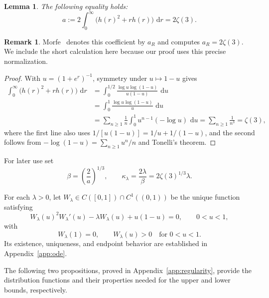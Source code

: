\documentclass[12pt,preprint]{amsart}
\numberwithin{equation}{section}
\theoremstyle{plain}
\newtheorem{lemma}[theorem]{Lemma}
\theoremstyle{definition}
\newtheorem{remark}[theorem]{Remark}
\newcommand{\dd}{\,\mathrm d}
\begin{document}
\begin{lemma}
\label{lem:diffusion-coefficient}
The following equality holds:
\begin{equation*}
a:=2\int_0^\infty\bigl(h(r)^2+rh(r)\bigr)\,\dd r=2\zeta(3).
\end{equation*}

\end{lemma}
\begin{remark}
   Morfe~\cite[Appendix~C]{Morfe2026} denotes this coefficient by \(a_R\)
and computes \(a_R=2\zeta(3)\). We include the short calculation here
because our proof uses this precise normalization.
\end{remark}
\begin{proof}

With $u=(1+e^r)^{-1}$, symmetry under $u\mapsto1-u$ gives
\[
\begin{aligned}
\int_0^\infty\bigl(h(r)^2+rh(r)\bigr)\,\dd r
 &=\int_0^{1/2}
   \frac{\log u\log(1-u)}{u(1-u)}\,\dd u
 \\&=\int_0^1\frac{\log u\log(1-u)}u\,\dd u\\
 &=\sum_{n\ge1}\frac1n
   \int_0^1u^{n-1}(-\log u)\,\dd u
 =\sum_{n\ge1}\frac1{n^3}
 =\zeta(3),
\end{aligned}
\]
where the first line also uses
$1/[u(1-u)]=1/u+1/(1-u)$, and the second follows from
$-\log(1-u)=\sum_{n\ge1}u^n/n$ and Tonelli's theorem.
\end{proof}

For later use set
\begin{equation}
 \beta=\left(\frac2a\right)^{1/3},
 \qquad
 \kappa_{\lambda}=\frac{2\lambda}{\beta}=2\zeta(3)^{1/3}\lambda.
 \label{eq:beta-kappa}
\end{equation}

For each $\lambda>0$, let
$W_\lambda\in C([0,1])\cap C^1((0,1))$ be the unique function satisfying
\[
W_\lambda(u)^2W_\lambda'(u)-\lambda W_\lambda(u)+u(1-u)=0,
\qquad 0<u<1,
\]
with
\[
W_\lambda(1)=0,
\qquad
W_\lambda(u)>0
\quad\text{for }0<u<1.
\]
Its existence, uniqueness, and endpoint behavior are established in
Appendix~\ref{app:ode}.

The following two propositions, proved in Appendix~\ref{app:regularity},
provide the distribution functions and their properties needed for the upper
and lower bounds, respectively.
\end{document}
